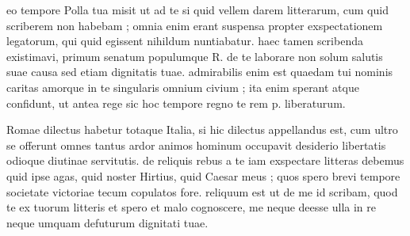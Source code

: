 


 eo tempore Polla tua misit ut ad te si quid vellem darem litterarum, cum quid scriberem non habebam ; omnia enim erant suspensa propter exspectationem legatorum, qui quid egissent nihildum nuntiabatur. haec tamen scribenda existimavi, primum senatum populumque R. de te laborare non solum salutis suae causa sed etiam dignitatis tuae. admirabilis enim est quaedam tui nominis caritas amorque in te singularis omnium civium ; ita enim sperant atque confidunt, ut antea rege sic hoc tempore regno te rem p. liberaturum.

 Romae dilectus habetur totaque Italia, si hic dilectus appellandus est, cum ultro se offerunt omnes tantus ardor animos hominum occupavit desiderio libertatis odioque diutinae servitutis. de reliquis rebus a te iam exspectare litteras debemus quid ipse agas, quid noster Hirtius, quid Caesar meus ; quos spero brevi tempore societate victoriae tecum copulatos fore. reliquum est ut de me id scribam, quod te ex tuorum litteris et spero et malo cognoscere, me neque deesse ulla in re neque umquam defuturum dignitati tuae.
